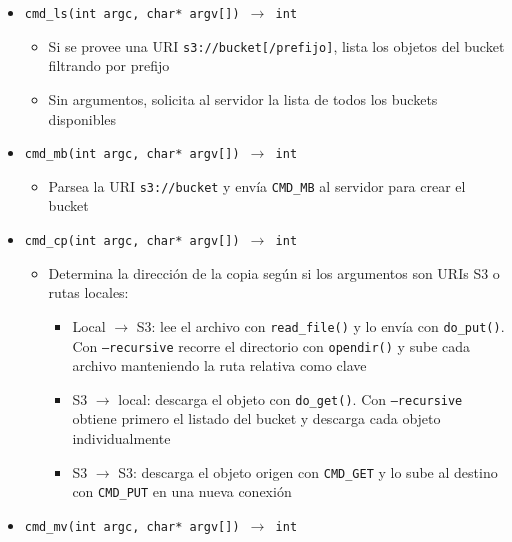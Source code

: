 \documentclass[12pt, letterpaper]{article}
\begin{document}
\begin{itemize}
    \subsection*{Comandos}
    \item \texttt{cmd\_ls(int argc, char* argv[]) $\to$ int}
        \begin{itemize}
            \item Si se provee una URI \texttt{s3://bucket[/prefijo]}, 
                  lista los objetos del bucket filtrando por prefijo
            \item Sin argumentos, solicita al servidor la lista de todos 
                  los buckets disponibles
        \end{itemize}
    \item \texttt{cmd\_mb(int argc, char* argv[]) $\to$ int}
        \begin{itemize}
            \item Parsea la URI \texttt{s3://bucket} y envía 
                  \texttt{CMD\_MB} al servidor para crear el bucket
        \end{itemize}
    \item \texttt{cmd\_cp(int argc, char* argv[]) $\to$ int}
        \begin{itemize}
            \item Determina la dirección de la copia según si los 
                  argumentos son URIs S3 o rutas locales:
            \begin{itemize}
                \item Local $\to$ S3: lee el archivo con 
                      \texttt{read\_file()} y lo envía con 
                      \texttt{do\_put()}. Con \texttt{--recursive} 
                      recorre el directorio con \texttt{opendir()} y 
                      sube cada archivo manteniendo la ruta relativa 
                      como clave
                \item S3 $\to$ local: descarga el objeto con 
                      \texttt{do\_get()}. Con \texttt{--recursive} 
                      obtiene primero el listado del bucket y descarga 
                      cada objeto individualmente
                \item S3 $\to$ S3: descarga el objeto origen con 
                      \texttt{CMD\_GET} y lo sube al destino con 
                      \texttt{CMD\_PUT} en una nueva conexión
            \end{itemize}
        \end{itemize}
    \item \texttt{cmd\_mv(int argc, char* argv[]) $\to$ int}

\end{itemize}
\end{document}
